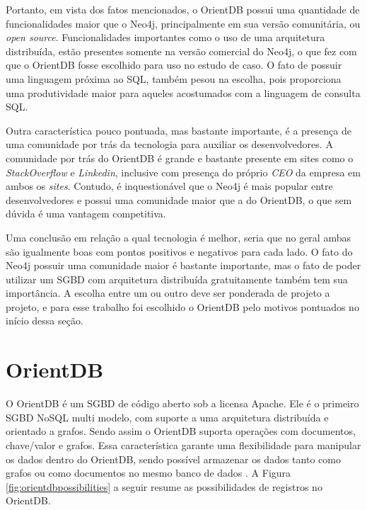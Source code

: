 	Portanto, em vista dos fatos mencionados, o OrientDB possui uma quantidade de funcionalidades maior que o Neo4j, principalmente em sua versão comunitária, ou \textit{open source}. Funcionalidades importantes como o uso de uma arquitetura distribuída, estão presentes somente na versão comercial do Neo4j, o que fez com que o OrientDB fosse escolhido para uso no estudo de caso. O fato de possuir uma linguagem próxima ao SQL, também pesou na escolha, pois proporciona uma produtividade maior para aqueles acostumados com a linguagem de consulta SQL.
	
	Outra característica pouco pontuada, mas bastante importante, é a presença de uma comunidade por trás da tecnologia para auxiliar os desenvolvedores. A comunidade por trás do OrientDB é grande e bastante presente em sites como o \textit{StackOverflow} \cite{orientStack} e \textit{Linkedin}, inclusive com presença do próprio \textit{CEO} da empresa em ambos os \textit{sites}. Contudo, é inquestionável que o Neo4j é mais popular entre desenvolvedores e possui uma comunidade maior que a do OrientDB, o que sem dúvida é uma vantagem competitiva.
	
	Uma conclusão em relação a qual tecnologia é melhor, seria que no geral ambas são igualmente boas com pontos positivos e negativos para cada lado. O fato do Neo4j possuir uma comunidade maior é bastante importante, mas o fato de poder utilizar um SGBD com arquitetura distribuída gratuitamente também tem sua importância. A escolha entre um ou outro deve ser ponderada de projeto a projeto, e para esse trabalho foi escolhido o OrientDB pelo motivos pontuados no início dessa seção.

\section{OrientDB} \label{OrientDBMain}
	
	O OrientDB é um SGBD de código aberto sob a licensa Apache. Ele é o primeiro SGBD NoSQL multi modelo, com suporte a uma arquitetura distribuída e orientado a grafos. Sendo assim o OrientDB suporta operações com documentos, chave/valor e grafos. Essa característica garante uma flexibilidade para manipular os dados dentro do OrientDB, sendo possível armazenar os dados tanto como grafos ou como documentos no mesmo banco de dados \cite{OrientDB}. A Figura \ref{fig:orientdbpossibilities} a seguir resume as possibilidades de registros no OrientDB.
	
